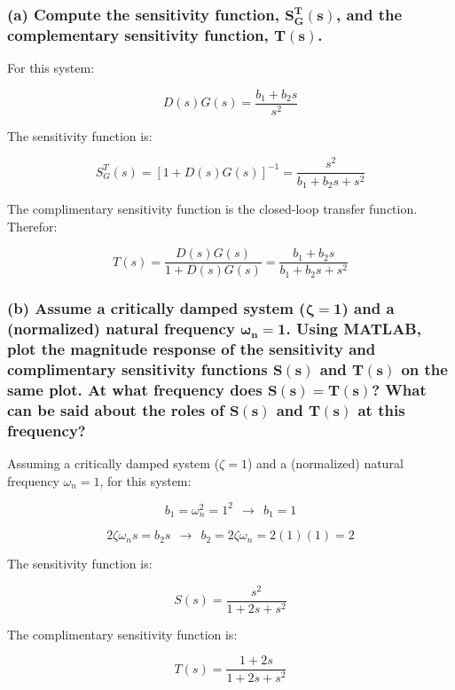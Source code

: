 \documentclass[12pt, letterpaper]{../assignment}
\begin{document}
\subsubsection*{
(a) Compute the sensitivity function, $\mathbf{S^T_G (s)}$,
and the complementary sensitivity function, $\mathbf{T(s)}$.}

For this system:

$$ D(s)G(s) = \frac{b_1 + b_2 s}{s^2} $$

The sensitivity function is:

\begin{answer}
    $$ S^T_G (s) =  [1 + D(s)G(s)]^{-1} = \frac{s^2}{b_1 + b_2 s + s^2} $$
\end{answer}

The complimentary sensitivity function is the closed-loop transfer function. Therefor:

\begin{answer}
    $$ T(s) =  \frac{D(s)G(s)}{1 + D(s)G(s)} = \frac{b_1 + b_2 s}{b_1 + b_2 s + s^2} $$
\end{answer}
\subsubsection*{
(b) Assume a critically damped system ($\mathbf{\zeta=1}$) and a (normalized) natural frequency $\mathbf{\omega_n=1}$.
Using MATLAB, plot the magnitude response of the sensitivity and complimentary sensitivity functions $\mathbf{S(s)}$ and $\mathbf{T(s)}$ on the same plot.
At what frequency does $\mathbf{S(s)=T(s)}$? What can be said about the roles of $\mathbf{S(s)}$ and $\mathbf{T(s)}$ at this frequency?}

Assuming a critically damped system ($\zeta=1$) and a (normalized) natural frequency $\omega_n=1$,
for this system:

$$ b_1 = \omega_n^2 = 1^2 \ \ \rightarrow \ \ b_1 = 1 $$

$$ 2 \zeta \omega_n s = b_2 s  \ \ \rightarrow \ \ b_2 = 2 \zeta \omega_n = 2 (1) (1) = 2 $$

The sensitivity function is:

$$ S(s) = \frac{s^2}{1 + 2 s + s^2} $$

The complimentary sensitivity function is:

$$ T(s) = \frac{1 + 2 s}{1 + 2 s + s^2} $$
\end{document}
